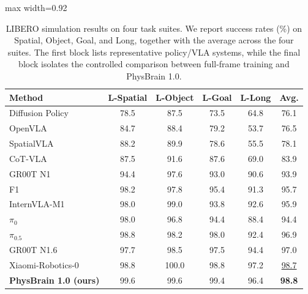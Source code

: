 \begin{table}[!t]
    \centering
    \setlength{\tabcolsep}{15pt}
    \renewcommand{\arraystretch}{1}
    \caption{
    LIBERO simulation results on four task suites.
    We report success rates (\%) on Spatial, Object, Goal, and Long, together with the average across the four suites.
    The first block lists representative policy/VLA systems, while the final block isolates the controlled comparison between full-frame training and PhysBrain 1.0.
    }
    \begin{adjustbox}{max width=0.92\linewidth}
    \begin{tabular}{lccccc}
        \toprule
        \textbf{Method} & \textbf{L-Spatial} & \textbf{L-Object} & \textbf{L-Goal} & \textbf{L-Long} & \textbf{Avg.} \\
        \midrule
        Diffusion Policy~\citep{DiffusionPolicy_23} & 78.5 & 87.5 & 73.5 & 64.8 & 76.1 \\
        OpenVLA~\citep{OpenVLA_2024_CoRL}          & 84.7 & 88.4 & 79.2 & 53.7 & 76.5 \\
        SpatialVLA~\citep{Spatialvla_2025_arXiv}       & 88.2 & 89.9 & 78.6 & 55.5 & 78.1 \\
        CoT-VLA~\citep{CoT-VLA}          & 87.5 & 91.6 & 87.6 & 69.0 & 83.9 \\
        GR00T N1~\citep{GR00T_2025_arXiv}         & 94.4 & 97.6 & 93.0 & 90.6 & 93.9 \\
        F1~\citep{F1-VLA_2025_arXiv}               & 98.2 & 97.8 & 95.4 & 91.3 & 95.7 \\
        InternVLA-M1~\citep{InternVLA_M1_25}     & 98.0 & 99.0 & 93.8 & 92.6 & 95.9 \\
        $\pi_0$~\citep{PI0_2024_arXiv}          & 98.0 & 96.8 & 94.4 & 88.4 & 94.4 \\
        $\pi_{0.5}$~\citep{PI05_2025_arXiv}      & 98.8 & 98.2 & 98.0 & 92.4 & 96.9 \\
        GR00T N1.6~\citep{GR00T_N1.6}       & 97.7 & 98.5 & 97.5 & 94.4 & 97.0 \\
        Xiaomi-Robotics-0~\citep{XiaomiRobotics0_2026_arxiv} & 98.8 & 100.0 & 98.8 & 97.2 & \underline{98.7} \\
        \midrule
        \rowcolor{gray!30}\textbf{PhysBrain 1.0 (ours)} & 99.6 & 99.6 & 99.4 & 96.4 & \textbf{98.8} \\
        \bottomrule
    \end{tabular}
    \end{adjustbox}
    \label{tab:libero_results}
\end{table}
